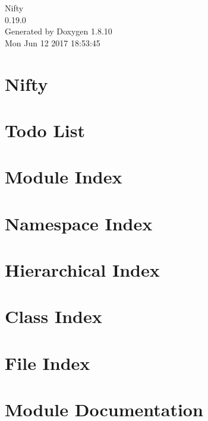 \documentclass[twoside]{book}
\newcommand{\+}{\discretionary{\mbox{\scriptsize$\hookleftarrow$}}{}{}}
\newcommand{\clearemptydoublepage}{%
  \newpage{\pagestyle{empty}\cleardoublepage}%
}
\begin{document}
\hypersetup{pageanchor=false,
             bookmarks=true,
             bookmarksnumbered=true,
             pdfencoding=unicode
            }
\begin{titlepage}
\vspace*{7cm}
\begin{center}%
{\Large Nifty \\[1ex]\large 0.\+19.\+0 }\\
\vspace*{1cm}
{\large Generated by Doxygen 1.8.10}\\
\vspace*{0.5cm}
{\small Mon Jun 12 2017 18:53:45}\\
\end{center}
\end{titlepage}
\clearemptydoublepage
\tableofcontents
\clearemptydoublepage
{}
\hypersetup{pageanchor=true}

\chapter{Nifty}
\label{index}\hypertarget{index}{}
\chapter{Todo List}
\label{todo}
\hypertarget{todo}{}

\chapter{Module Index}

\chapter{Namespace Index}

\chapter{Hierarchical Index}

\chapter{Class Index}

\chapter{File Index}

\chapter{Module Documentation}

\end{document}
